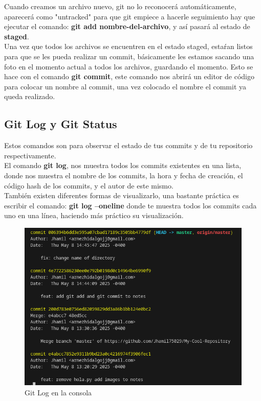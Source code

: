 \documentclass[13pt]{article}
\begin{document}
Cuando creamos un archivo nuevo, git no lo reconocerá automáticamente, aparecerá como "untracked" para que git empiece a hacerle seguimiento hay que ejecutar el comando: \textbf{git add nombre-del-archivo}, y así pasará al estado de \textbf{staged}.\\

Una vez que todos los archivos se encuentren en el estado staged, estaŕan listos para que se les pueda realizar un commit, básicamente les estamos sacando una foto en el momento actual a todos los archivos, guardando el momento. Esto se hace con el comando \textbf{git commit}, este comando nos abrirá un editor de código para colocar un nombre al commit, una vez colocado el nombre el commit ya queda realizado.

\subsection{Git Log y Git Status}
Estos comandos son para observar el estado de tus commits y de tu repositorio respectivamente.\\

El comando \textbf{git log}, nos muestra todos los commits existentes en una lista, donde nos muestra el nombre de los commits, la hora y fecha de creación, el código hash de los commits, y el autor de este mismo.\\
También existen diferentes formas de visualizarlo, una bastante práctica es escribir el comando: \textbf{git log --oneline} donde te muestra todos los commits cada uno en una línea, haciendo más práctico su visualización.
\begin{figure}[H]
	\centering
	\includegraphics[scale = 0.4]{Images/gitlog1.png}
	\caption {\small Git Log en la consola}
\end{figure}
\end{document}
